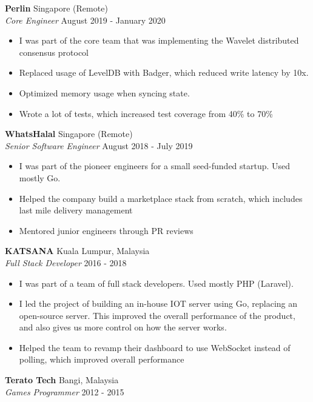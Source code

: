 \documentclass[a4paper]{article}
\begin{document}
\textbf{Perlin} \hfill Singapore (Remote)\\
\textit{Core Engineer} \hfill August 2019 - January 2020\\
\vspace{-1mm}
\begin{itemize} \itemsep 1pt
	\item I was part of the core team that was implementing the Wavelet distributed consensus protocol
	\item Replaced usage of LevelDB with Badger, which reduced write latency by 10x.
	\item Optimized memory usage when syncing state.
	\item Wrote a lot of tests, which increased test coverage from 40\% to 70\%
\end{itemize}
\textbf{WhatsHalal} \hfill Singapore (Remote)\\
\textit{Senior Software Engineer} \hfill August 2018 - July 2019\\
\vspace{-1mm}
\begin{itemize} \itemsep 1pt
	\item I was part of the pioneer engineers for a small seed-funded startup. Used mostly Go.
	\item Helped the company build a marketplace stack from scratch, which includes last mile delivery management
	\item Mentored junior engineers through PR reviews
\end{itemize}
\pagebreak
\textbf{KATSANA} \hfill Kuala Lumpur, Malaysia\\
\textit{Full Stack Developer} \hfill 2016 - 2018\\
\vspace{-1mm}
\begin{itemize} \itemsep 1pt
	\item I was part of a team of full stack developers. Used mostly PHP (Laravel).
	\item I led the project of building an in-house IOT server using Go, replacing an open-source server. This improved the overall performance of the product, and also gives us more control on how the server works.
	\item Helped the team to revamp their dashboard to use WebSocket instead of polling, which improved overall performance
\end{itemize}
\textbf{Terato Tech} \hfill Bangi, Malaysia\\
\textit{Games Programmer} \hfill 2012 - 2015\\
\end{document}
